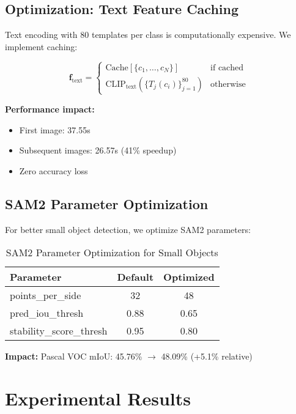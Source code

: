 \subsection{Optimization: Text Feature Caching}

Text encoding with 80 templates per class is computationally expensive. We implement caching:

\begin{equation}
\mathbf{f}_{\text{text}} =
\begin{cases}
\text{Cache}[\{c_1, \ldots, c_N\}] & \text{if cached} \\
\text{CLIP}_{\text{text}}(\{T_j(c_i)\}_{j=1}^{80}) & \text{otherwise}
\end{cases}
\end{equation}

\textbf{Performance impact:}
\begin{itemize}
    \item First image: 37.55s
    \item Subsequent images: 26.57s (41\% speedup)
    \item Zero accuracy loss
\end{itemize}

\subsection{SAM2 Parameter Optimization}

For better small object detection, we optimize SAM2 parameters:

\begin{table}[h]
\centering
\caption{SAM2 Parameter Optimization for Small Objects}
\label{tab:sam_params}
\begin{tabular}{lcc}
\hline
\textbf{Parameter} & \textbf{Default} & \textbf{Optimized} \\
\hline
points\_per\_side & 32 & 48 \\
pred\_iou\_thresh & 0.88 & 0.65 \\
stability\_score\_thresh & 0.95 & 0.80 \\
\hline
\end{tabular}
\end{table}

\textbf{Impact:} Pascal VOC mIoU: 45.76\% $\rightarrow$ 48.09\% (+5.1\% relative)

\section{Experimental Results}

